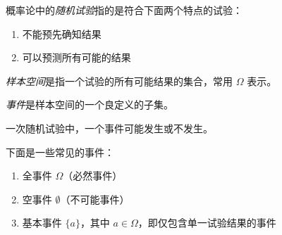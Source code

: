 \documentclass[../main.tex]{subfiles}
\begin{document}
\begin{definition}\label{def:1.2.1}
    概率论中的\emph{随机试验}指的是符合下面两个特点的试验：
    \begin{enumerate}
        \item 不能预先确知结果
        \item 可以预测所有可能的结果
    \end{enumerate}
\end{definition}

\begin{definition}\label{def:1.2.2}
    \emph{样本空间}是指一个试验的所有可能结果的集合，常用 $\Omega$ 表示。
\end{definition}

\begin{definition}\label{def:1.2.3}
    \emph{事件}是样本空间的一个良定义的子集。
\end{definition}

一次随机试验中，一个事件可能发生或不发生。

下面是一些常见的事件：
\begin{enumerate}
    \item 全事件 $\Omega$（必然事件）
    \item 空事件 $\emptyset$（不可能事件）
    \item 基本事件 $\{a\}$，其中 $a\in\Omega$，即仅包含单一试验结果的事件
\end{enumerate}
\end{document}
